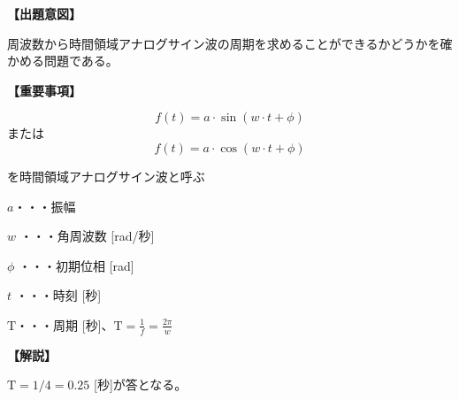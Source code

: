\noindent \textbf{【出題意図】}

\noindent 周波数から時間領域アナログサイン波の周期を求めることができるかどうかを確かめる問題である。

\vspace{1em}
\noindent \textbf{【重要事項】}

\fleqnoff
\[
f(t) = a \cdot \sin( w \cdot t + \phi )
\]
\fleqnon
%
\noindent または
%
\fleqnoff
\[
f(t) = a \cdot \cos( w \cdot t + \phi )
\]
\fleqnon

\medskip
\noindent を時間領域アナログサイン波と呼ぶ

\bigskip
\noindent $a$・・・振幅

\bigskip
\noindent $w$ ・・・角周波数 [rad/秒]

\bigskip
\noindent $\phi$ ・・・初期位相 [rad]

\bigskip
\noindent $t$ ・・・時刻 [秒]

\bigskip
$\textrm{T}$・・・周期 [秒]、$\textrm{T} = \frac{1}{f} = \frac{2\pi}{w}$

\vspace{1em}
\noindent \textbf{【解説】}

\noindent $\textrm{T} = 1/4 = 0.25$ [秒]が答となる。

